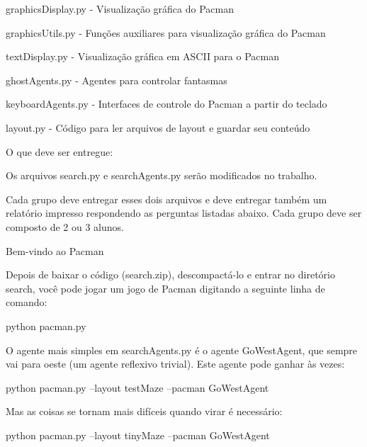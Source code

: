 \begin{DoxyItemize}
\item {\ttfamily graphics\+Display.\+py} -\/ Visualização gráfica do Pacman
\item {\ttfamily graphics\+Utils.\+py} -\/ Funções auxiliares para visualização gráfica do Pacman
\item {\ttfamily text\+Display.\+py} -\/ Visualização gráfica em A\+S\+C\+II para o Pacman
\item {\ttfamily ghost\+Agents.\+py} -\/ Agentes para controlar fantasmas
\item {\ttfamily keyboard\+Agents.\+py} -\/ Interfaces de controle do Pacman a partir do teclado
\item {\ttfamily layout.\+py} -\/ Código para ler arquivos de layout e guardar seu conteúdo
\end{DoxyItemize}

O que deve ser entregue\+:


\begin{DoxyItemize}
\item Os arquivos {\ttfamily search.\+py} e {\ttfamily search\+Agents.\+py} serão modificados no trabalho.
\end{DoxyItemize}

Cada grupo deve entregar esses dois arquivos e deve entregar também um relatório impresso respondendo as perguntas listadas abaixo. Cada grupo deve ser composto de 2 ou 3 alunos.

Bem-\/vindo ao Pacman

Depois de baixar o código (search.\+zip), descompactá-\/lo e entrar no diretório search, você pode jogar um jogo de Pacman digitando a seguinte linha de comando\+:


\begin{DoxyCode}
python pacman.py
\end{DoxyCode}


O agente mais simples em {\ttfamily search\+Agents.\+py} é o agente {\ttfamily Go\+West\+Agent}, que sempre vai para oeste (um agente reflexivo trivial). Este agente pode ganhar às vezes\+:


\begin{DoxyCode}
python pacman.py --layout testMaze --pacman GoWestAgent
\end{DoxyCode}


Mas as coisas se tornam mais difíceis quando virar é necessário\+:


\begin{DoxyCode}
python pacman.py --layout tinyMaze --pacman GoWestAgent
\end{DoxyCode}



